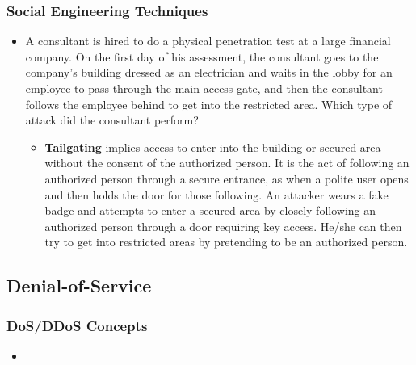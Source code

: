 \subsubsection{Social Engineering Techniques}
\begin{itemize}
    \item A consultant is hired to do a physical penetration test at a large financial company. On the first day of his assessment, the consultant goes to the company's building dressed as an electrician and waits in the lobby for an employee to pass through the main access gate, and then the consultant follows the employee behind to get into the restricted area. Which type of attack did the consultant perform?
    \begin{itemize}
        \item \textbf{Tailgating} implies access to enter into the building or secured area without the consent of the authorized person. It is the act of following an authorized person through a secure entrance, as when a polite user opens and then holds the door for those following. An attacker wears a fake badge and attempts to enter a secured area by closely following an authorized person through a door requiring key access. He/she can then try to get into restricted areas by pretending to be an authorized person.
    \end{itemize}
\end{itemize}


\subsection{Denial-of-Service}
\subsubsection{DoS/DDoS Concepts}
\begin{itemize}
    \item 
\end{itemize}
